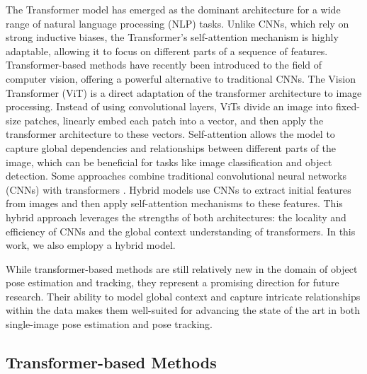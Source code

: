 The Transformer model \cite{vaswani2017attention} has emerged as the dominant architecture for a wide range of natural language processing (NLP) tasks. Unlike CNNs, which rely on strong inductive biases, the Transformer's self-attention mechanism is highly adaptable, allowing it to focus on different parts of a sequence of features. Transformer-based methods have recently been introduced to the field of computer vision, offering a powerful alternative to traditional CNNs. The Vision Transformer (ViT) \cite{dosovitskiy2020image} is a direct adaptation of the transformer architecture to image processing. Instead of using convolutional layers, ViTs divide an image into fixed-size patches, linearly embed each patch into a vector, and then apply the transformer architecture to these vectors. Self-attention allows the model to capture global dependencies and relationships between different parts of the image, which can be beneficial for tasks like image classification and object detection. Some approaches combine traditional convolutional neural networks (CNNs) with transformers \cite{liu2021swin, guo2022cmt}. Hybrid models use CNNs to extract initial features from images and then apply self-attention mechanisms to these features. This hybrid approach leverages the strengths of both architectures: the locality and efficiency of CNNs and the global context understanding of transformers. In this work, we also emplopy a hybrid model. 

While transformer-based methods are still relatively new in the domain of object pose estimation and tracking, they represent a promising direction for future research. Their ability to model global context and capture intricate relationships within the data makes them well-suited for advancing the state of the art in both single-image pose estimation and pose tracking.

\subsection{Transformer-based Methods}

